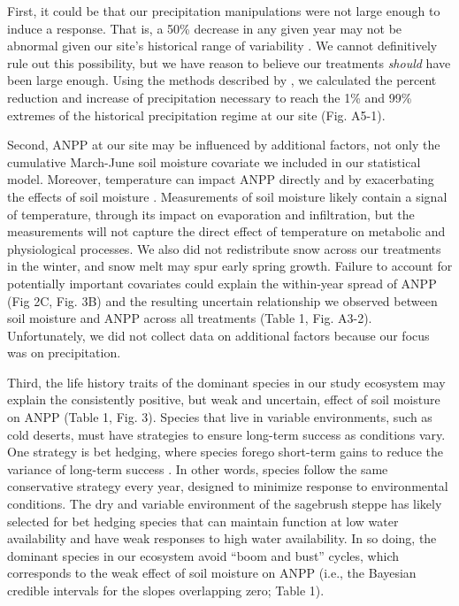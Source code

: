 \documentclass[fleqn,10pt,lineno]{wlpeerj} %
\begin{document}
First, it could be that our precipitation manipulations were not large
enough to induce a response. That is, a 50\% decrease in any given year
may not be abnormal given our site's historical range of variability
\citep{Knapp2017}. We cannot definitively rule out this possibility, but
we have reason to believe our treatments \emph{should} have been large
enough. Using the methods described by \citet{Lemoine2016}, we
calculated the percent reduction and increase of 
precipitation necessary to reach the 1\% and 99\% extremes of the
historical precipitation regime at our site (Fig. A5-1).

Second, ANPP at our site may be influenced by additional factors, not
only the cumulative March-June soil moisture covariate we included in
our statistical model.  \citet{LaPierre2016}
Moreover, temperature can impact ANPP directly \citep{Epstein1997} and
by exacerbating the effects of soil moisture \citep{DeBoeck2011}.
Measurements of soil moisture likely contain a signal of temperature,
through its impact on evaporation and infiltration, but the measurements
will not capture the direct effect of temperature on metabolic and
physiological processes. We also did not redistribute snow across our
treatments in the winter, and snow melt may spur early spring growth.
Failure to account for potentially important covariates could explain
the within-year spread of ANPP (Fig 2C, Fig. 3B) and the resulting
uncertain relationship we observed between soil moisture and ANPP across
all treatments (Table 1, Fig. A3-2). Unfortunately, we did not collect
data on additional factors because our focus was on precipitation.

Third, the life history traits of the dominant species in our study
ecosystem may explain the consistently positive, but weak and uncertain,
effect of soil moisture on ANPP (Table 1, Fig. 3). Species that live in
variable environments, such as cold deserts, must have strategies to
ensure long-term success as conditions vary. One strategy is bet
hedging, where species forego short-term gains to reduce the variance of
long-term success \citep{Seger1987}. In other words, species follow the
same conservative strategy every year, designed to minimize response to
environmental conditions. The dry and variable environment of the
sagebrush steppe has likely selected for bet hedging species that can
maintain function at low water availability and have weak responses to
high water availability. In so doing, the dominant species in our
ecosystem avoid ``boom and bust'' cycles, which corresponds to the weak
effect of soil moisture on ANPP (i.e., the Bayesian credible intervals
for the slopes overlapping zero; Table 1).
\end{document}
